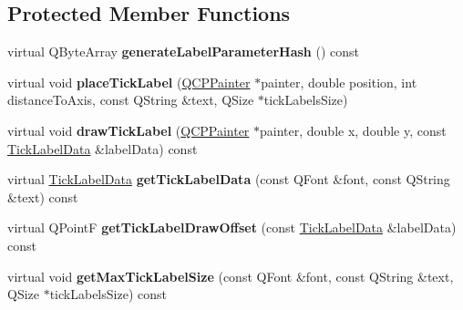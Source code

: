 \subsection*{Protected Member Functions}
\begin{DoxyCompactItemize}
\item 
\mbox{\label{classQCPAxisPainterPrivate_ab6f77ae2bd3eccca3fef4b7ec8e34b31}} 
virtual Q\+Byte\+Array {\bfseries generate\+Label\+Parameter\+Hash} () const
\item 
\mbox{\label{classQCPAxisPainterPrivate_af8fe7350c19575bc33ca770f9b3a15fd}} 
virtual void {\bfseries place\+Tick\+Label} (\hyperlink{classQCPPainter}{Q\+C\+P\+Painter} $\ast$painter, double position, int distance\+To\+Axis, const Q\+String \&text, Q\+Size $\ast$tick\+Labels\+Size)
\item 
\mbox{\label{classQCPAxisPainterPrivate_aab666e1d85b234afbc88076c7ba9424a}} 
virtual void {\bfseries draw\+Tick\+Label} (\hyperlink{classQCPPainter}{Q\+C\+P\+Painter} $\ast$painter, double x, double y, const \hyperlink{structQCPAxisPainterPrivate_1_1TickLabelData}{Tick\+Label\+Data} \&label\+Data) const
\item 
\mbox{\label{classQCPAxisPainterPrivate_a5331f78e398da5442767c261578da502}} 
virtual \hyperlink{structQCPAxisPainterPrivate_1_1TickLabelData}{Tick\+Label\+Data} {\bfseries get\+Tick\+Label\+Data} (const Q\+Font \&font, const Q\+String \&text) const
\item 
\mbox{\label{classQCPAxisPainterPrivate_a6205b60c7d305854ffd7602139433f6e}} 
virtual Q\+PointF {\bfseries get\+Tick\+Label\+Draw\+Offset} (const \hyperlink{structQCPAxisPainterPrivate_1_1TickLabelData}{Tick\+Label\+Data} \&label\+Data) const
\item 
\mbox{\label{classQCPAxisPainterPrivate_a7a961f0e05c57b51cf1100b05e93f5b9}} 
virtual void {\bfseries get\+Max\+Tick\+Label\+Size} (const Q\+Font \&font, const Q\+String \&text, Q\+Size $\ast$tick\+Labels\+Size) const
\end{DoxyCompactItemize}
